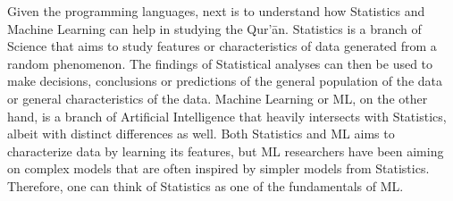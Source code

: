 Given the programming languages, next is to understand how Statistics and Machine Learning can help in studying the Qur'\=an. Statistics is a branch of Science that aims to study features or characteristics of data generated from a random phenomenon. The findings of Statistical analyses can then be used to make decisions, conclusions or predictions of the general population of the data or general characteristics of the data. Machine Learning or ML, on the other hand, is a branch of Artificial Intelligence that heavily intersects with Statistics, albeit with distinct differences as well. Both Statistics and ML aims to characterize data by learning its features, but ML researchers have been aiming on complex models that are often inspired by simpler models from Statistics. Therefore, one can think of Statistics as one of the fundamentals of ML. 

